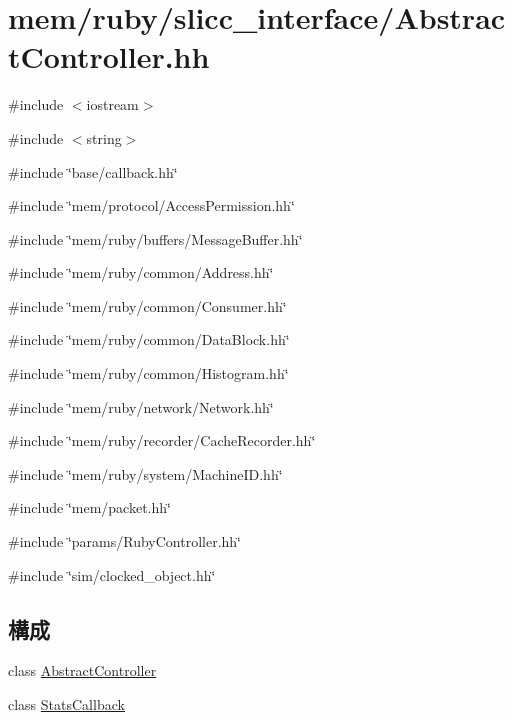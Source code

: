 \hypertarget{AbstractController_8hh}{
\section{mem/ruby/slicc\_\-interface/AbstractController.hh}
\label{AbstractController_8hh}
}
{\ttfamily \#include $<$iostream$>$}\par
{\ttfamily \#include $<$string$>$}\par
{\ttfamily \#include \char`\"{}base/callback.hh\char`\"{}}\par
{\ttfamily \#include \char`\"{}mem/protocol/AccessPermission.hh\char`\"{}}\par
{\ttfamily \#include \char`\"{}mem/ruby/buffers/MessageBuffer.hh\char`\"{}}\par
{\ttfamily \#include \char`\"{}mem/ruby/common/Address.hh\char`\"{}}\par
{\ttfamily \#include \char`\"{}mem/ruby/common/Consumer.hh\char`\"{}}\par
{\ttfamily \#include \char`\"{}mem/ruby/common/DataBlock.hh\char`\"{}}\par
{\ttfamily \#include \char`\"{}mem/ruby/common/Histogram.hh\char`\"{}}\par
{\ttfamily \#include \char`\"{}mem/ruby/network/Network.hh\char`\"{}}\par
{\ttfamily \#include \char`\"{}mem/ruby/recorder/CacheRecorder.hh\char`\"{}}\par
{\ttfamily \#include \char`\"{}mem/ruby/system/MachineID.hh\char`\"{}}\par
{\ttfamily \#include \char`\"{}mem/packet.hh\char`\"{}}\par
{\ttfamily \#include \char`\"{}params/RubyController.hh\char`\"{}}\par
{\ttfamily \#include \char`\"{}sim/clocked\_\-object.hh\char`\"{}}\par
\subsection*{構成}
\begin{DoxyCompactItemize}
\item 
class \hyperlink{classAbstractController}{AbstractController}
\item 
class \hyperlink{classAbstractController_1_1StatsCallback}{StatsCallback}
\end{DoxyCompactItemize}
